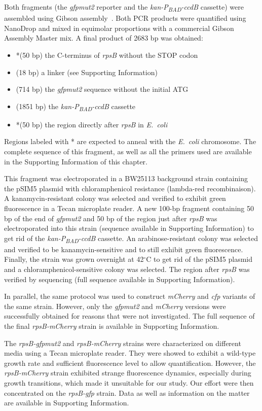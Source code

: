 Both fragments (the \textit{gfpmut2} reporter and the \textit{kan-P\textsubscript{BAD}-ccdB} cassette) were assembled using Gibson assembly~\cite{gibson_enzymatic_2009}.
Both PCR products were quantified using NanoDrop and mixed in equimolar proportions with a commercial Gibson Assembly Master mix.
A final product of 2683 bp was obtained:
\begin{itemize}
\item *(50 bp) the C-terminus of \textit{rpsB} without the STOP codon 
\item (18 bp) a linker (see Supporting Information)
\item (714 bp) the \textit{gfpmut2} sequence without the initial ATG
\item (1851 bp) the \textit{kan-P\textsubscript{BAD}-ccdB} cassette
\item *(50 bp) the region directly after \textit{rpsB} in \textit{E.~coli}
\end{itemize}
Regions labeled with * are expected to anneal with the \textit{E.~coli} chromosome.
The complete sequence of this fragment, as well as all the primers used are available in the Supporting Information of this chapter.

This fragment was electroporated in a BW25113 background strain containing the pSIM5 plasmid with chloramphenicol resistance (lambda-red recombinaison).
A kanamycin-resistant colony was selected and verified to exhibit green fluorescence in a Tecan microplate reader.
A new 100-bp fragment containing 50 bp of the end of \textit{gfpmut2} and 50 bp of the region just after \textit{rpsB} was electroporated into this strain (sequence available in Supporting Information) to get rid of the \textit{kan-P\textsubscript{BAD}-ccdB} cassette.
An arabinose-resistant colony was selected and verified to be kanamycin-sensitive and to still exhibit green fluorescence.
Finally, the strain was grown overnight at 42$^\circ$C to get rid of the pSIM5 plasmid and a chloramphenicol-sensitive colony was selected.
The region after \textit{rpsB} was verified by sequencing (full sequence available in Supporting Information).

In parallel, the same protocol was used to construct \textit{mCherry} and \textit{cfp} variants of the same strain.
However, only the \textit{gfpmut2} and \textit{mCherry} versions were successfully obtained for reasons that were not investigated.
The full sequence of the final \textit{rpsB-mCherry} strain is available in Supporting Information.

The \textit{rpsB-gfpmut2} and \textit{rpsB-mCherry} strains were characterized on different media using a Tecan microplate reader.
They were showed to exhibit a wild-type growth rate and sufficient fluorescence level to allow quantification.
However, the \textit{rpsB-mCherry} strain exhibited strange fluorescence dynamics, especially during growth transitions, which made it unsuitable for our study.
Our effort were then concentrated on the \textit{rpsB-gfp} strain.
Data as well as information on the matter are available in Supporting Information.

